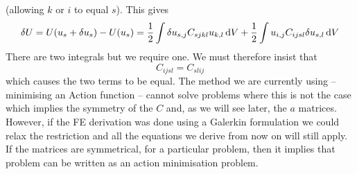 \documentclass[a4paper]{article}
\begin{document}
(allowing $k$ or $i$ to equal $s$). This gives
\begin{equation}
  \delta U=U(u_s+\delta u_s)-U(u_s)=
\frac12\int \delta u_{s,j} C_{sjkl} u_{k,l}\, \mathrm{d} V
+ \frac12\int u_{i,j} C_{ijsl} \delta u_{s,l}\, \mathrm{d} V
\label{dU}
\end{equation}
There are two integrals but we require one. We must therefore insist
that 
\begin{equation}
  C_{ijsl}=C_{slij}
\label{Csym}
\end{equation}
which causes the two terms to be equal. The method we are currently
using -- minimising an Action function -- cannot solve problems where
this is not the case which implies the symmetry of the $C$ and, as we
will see later, the $a$ matrices. However, if the FE derivation was
done using a Galerkin formulation we could relax the restriction
 and all the equations we derive from now on will still
apply. If the matrices are symmetrical, for a particular problem, then
it implies that problem can be written as an action minimisation
problem.
\end{document}
